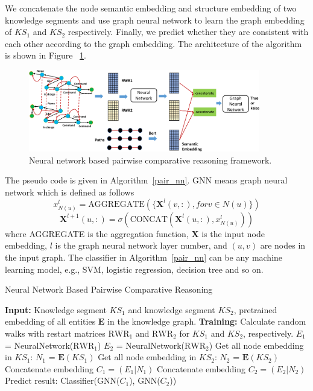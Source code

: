 We concatenate the node semantic embedding and structure embedding of two knowledge segments and use graph neural network to learn the graph embedding of $KS_1$ and $KS_2$ respectively. Finally, we predict whether they are consistent with each other according to the graph embedding. The architecture of the algorithm is shown in Figure ~\ref{nn_pairwise}.


\begin{figure}[ht!]
\centering
\includegraphics[width=0.9\textwidth]{submissions/logical-queries-uiuc/img/nn_pairwise_reasoning.pdf}
\caption{Neural network based pairwise comparative reasoning framework.
}
\label{nn_pairwise}
\end{figure}

The pseudo code is given in Algorithm~\ref{pair_nn}. GNN means graph neural network which is defined as follows
\begin{equation}
    x^l_{N(u)} = \textrm{AGGREGATE}(\{\mathbf{X}^l(v,:), for v\in N(u)\})
\end{equation}
\begin{equation}
    \mathbf{X}^{l+1}(u,:) = \sigma(\textrm{CONCAT}(\mathbf{X}^l(u,:), x^l_{N(u)}))
\end{equation}
where AGGREGATE is the aggregation function, $\mathbf{X}$ is the input node embedding, $l$ is the graph neural network layer number, and $(u, v)$ are nodes in the input graph. The classifier in Algorithm~\ref{pair_nn} can be any machine learning model, e.g., SVM, logistic regression, decision tree and so on.

\begin{algorithm}[H] %
	\caption{Neural Network Based Pairwise Comparative Reasoning} %
	\label{pair_nn}
	\begin{algorithmic}[1]
		\STATE \textbf{Input:} Knowledge segment $KS_1$ and knowledge segment $KS_2$, pretrained embedding of all entities $\mathbf{E}$ in the knowledge graph.
		\STATE \textbf{Training:}
		\STATE Calculate random walks with restart matrices $\textrm{RWR}_1$  and $\textrm{RWR}_2$ for $KS_1$ and  $KS_2$, respectively.
		\STATE $E_{1}$ = NeuralNetwork($\textrm{RWR}_{1}$)
		\STATE  $E_{2}$ = NeuralNetwork($\textrm{RWR}_{2}$)
		\STATE Get all node embedding in $KS_1$: $N_{1}$ = $\mathbf{E}(KS_1)$
		\STATE Get all node embedding in $KS_2$: $N_{2}$ = $\mathbf{E}(KS_2)$
  	\STATE Concatenate embedding $C_1 = (E_{1} | N_{1})$
        \STATE Concatenate embedding $C_2 = (E_{2} | N_{2})$
        \STATE Predict result: Classifier(GNN($C_1$), GNN($C_2$))
	\end{algorithmic}
\end{algorithm}
\vspace{-1\baselineskip}

